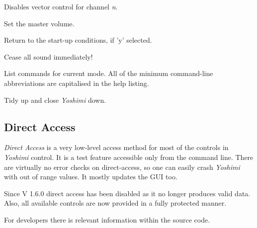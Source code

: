       Disables vector control for channel \textsl{n}.

      Set the master volume.

      Return to the start-up conditions, if 'y' selected.

      Cease all sound immediately!

      List commands for current mode.  All of the minimum command-line
      abbreviations are capitalised in the help listing.

         Tidy up and close \textsl{Yoshimi} down.

\subsection{Direct Access}
\label{subsec:command_line_direct_access}

   \textsl{Direct Access} is a very low-level access method for most of the
   controls in \textsl{Yoshimi} control.
   It is a test feature accessible only from the command line.
   There are virtually no error checks on direct-access, so one can easily
   crash \textsl{Yoshimi} with out of range values.
   It mostly updates the GUI too.


    Since V 1.6.0 direct access has been disabled as it no longer produces
    valid data. Also, all available controls are now provided in a fully
    protected manner.

   For developers there is relevant information within the source code.

